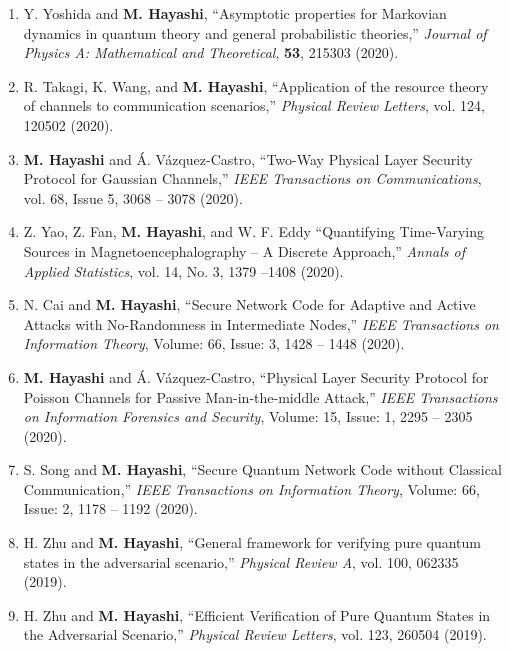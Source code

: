 \documentclass[a4paper,12pt,oneside]{article}
\begin{document}
\begin{enumerate}
\item  
Y. Yoshida and \textbf{M. Hayashi},
``Asymptotic properties for Markovian dynamics in quantum theory and general probabilistic theories,'' 
{\em Journal of Physics A: Mathematical and Theoretical}, 
{\bf 53}, 215303 (2020).

\item  
R. Takagi, K. Wang, and \textbf{M. Hayashi},
``Application of the resource theory of channels to communication scenarios,'' 
{\em Physical Review Letters}, 
vol. 124, 120502 (2020).

\item  
\textbf{M. Hayashi} and \'{A}. V\'{a}zquez-Castro,
``Two-Way Physical Layer Security Protocol for Gaussian Channels,'' 
{\em IEEE Transactions on Communications},
vol. 68, Issue 5, 3068 -- 3078 (2020).

\item  
Z. Yao, Z. Fan, \textbf{M. Hayashi}, and W. F. Eddy
``Quantifying Time-Varying Sources in Magnetoencephalography -- A Discrete Approach,''
{\em Annals of Applied Statistics},
vol. 14, No. 3, 1379 --1408 (2020).

\item  
N. Cai and \textbf{M. Hayashi},
``Secure Network Code for Adaptive and Active Attacks with No-Randomness in Intermediate Nodes,''
{\em IEEE Transactions on Information Theory}, Volume: 66, Issue: 3, 1428 -- 1448 (2020). 

\item  
\textbf{M. Hayashi} and \'{A}. V\'{a}zquez-Castro,
``Physical Layer Security Protocol for Poisson Channels 
for Passive Man-in-the-middle Attack,'' 
{\em IEEE Transactions on Information Forensics and Security},
Volume: 15, Issue: 1, 2295 -- 2305 (2020). 

\item  
S. Song and \textbf{M. Hayashi},
``Secure Quantum Network Code without Classical Communication,''
{\em IEEE Transactions on Information Theory}, 
Volume: 66, Issue: 2, 1178 -- 1192 (2020). 

\item 
H. Zhu and \textbf{M. Hayashi},
``General framework for verifying pure quantum states in the adversarial scenario,''
{\em Physical Review A}, 
vol. 100, 062335 (2019).
 
\item 
H. Zhu and \textbf{M. Hayashi},
``Efficient Verification of Pure Quantum States in the Adversarial Scenario,''
{\em Physical Review Letters}, 
vol. 123, 260504 (2019).


\end{enumerate}
\end{document}
